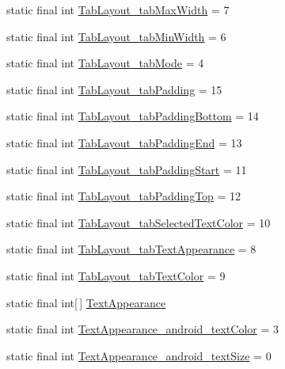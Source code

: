 \begin{DoxyCompactItemize}
\item 
static final int \hyperlink{classcheck_1_1test_1_1_r_1_1styleable_a53f614a296e5bfb7bb73efa8b8b97a85}{Tab\+Layout\+\_\+tab\+Max\+Width} = 7
\item 
static final int \hyperlink{classcheck_1_1test_1_1_r_1_1styleable_aa3b9b9d3b5f02ead0c41b9100556ca2a}{Tab\+Layout\+\_\+tab\+Min\+Width} = 6
\item 
static final int \hyperlink{classcheck_1_1test_1_1_r_1_1styleable_a88d621242008fb6057c34ed8469247ae}{Tab\+Layout\+\_\+tab\+Mode} = 4
\item 
static final int \hyperlink{classcheck_1_1test_1_1_r_1_1styleable_a6426fde2392c9bb8c68b9824ba4a31d5}{Tab\+Layout\+\_\+tab\+Padding} = 15
\item 
static final int \hyperlink{classcheck_1_1test_1_1_r_1_1styleable_aca2df98e251a1a4ec4ae92a5fbd6d93d}{Tab\+Layout\+\_\+tab\+Padding\+Bottom} = 14
\item 
static final int \hyperlink{classcheck_1_1test_1_1_r_1_1styleable_ac49de9adbf423ca62f717d2cad3f8e55}{Tab\+Layout\+\_\+tab\+Padding\+End} = 13
\item 
static final int \hyperlink{classcheck_1_1test_1_1_r_1_1styleable_a680abf2e357062993996fc1cf323e63a}{Tab\+Layout\+\_\+tab\+Padding\+Start} = 11
\item 
static final int \hyperlink{classcheck_1_1test_1_1_r_1_1styleable_a17d7a02e6dcc33c6369bab9530248be5}{Tab\+Layout\+\_\+tab\+Padding\+Top} = 12
\item 
static final int \hyperlink{classcheck_1_1test_1_1_r_1_1styleable_a8de68a289b7ff055235fa32b1699d7c0}{Tab\+Layout\+\_\+tab\+Selected\+Text\+Color} = 10
\item 
static final int \hyperlink{classcheck_1_1test_1_1_r_1_1styleable_a72cd16a486f24d8a85c804b159034a9b}{Tab\+Layout\+\_\+tab\+Text\+Appearance} = 8
\item 
static final int \hyperlink{classcheck_1_1test_1_1_r_1_1styleable_a904165c0c64b601cb32165f90094f08d}{Tab\+Layout\+\_\+tab\+Text\+Color} = 9
\item 
static final int\mbox{[}$\,$\mbox{]} \hyperlink{classcheck_1_1test_1_1_r_1_1styleable_a7fad54db5b363c4751d9f6f6ead61bc9}{Text\+Appearance}
\item 
static final int \hyperlink{classcheck_1_1test_1_1_r_1_1styleable_a25beaa4ed9513b44df22fb79b076e5e8}{Text\+Appearance\+\_\+android\+\_\+text\+Color} = 3
\item 
static final int \hyperlink{classcheck_1_1test_1_1_r_1_1styleable_a302a2412b9bd0616ccff3d22bd450d19}{Text\+Appearance\+\_\+android\+\_\+text\+Size} = 0

\end{DoxyCompactItemize}
